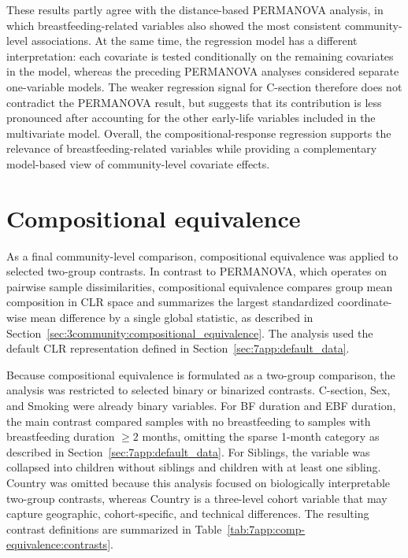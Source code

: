 These results partly agree with the distance-based PERMANOVA analysis, in which breastfeeding-related variables also showed the most consistent community-level associations. At the same time, the regression model has a different interpretation: each covariate is tested conditionally on the remaining covariates in the model, whereas the preceding PERMANOVA analyses considered separate one-variable models. The weaker regression signal for C-section therefore does not contradict the PERMANOVA result, but suggests that its contribution is less pronounced after accounting for the other early-life variables included in the multivariate model. Overall, the compositional-response regression supports the relevance of breastfeeding-related variables while providing a complementary model-based view of community-level covariate effects.

\section{Compositional equivalence}
\label{sec:7app:compositional-equivalence}

As a final community-level comparison, compositional equivalence was applied to selected two-group contrasts. In contrast to PERMANOVA, which operates on pairwise sample dissimilarities, compositional equivalence compares group mean composition in CLR space and summarizes the largest standardized coordinate-wise mean difference by a single global statistic, as described in Section~\ref{sec:3community:compositional_equivalence}. The analysis used the default CLR representation defined in Section~\ref{sec:7app:default_data}.

Because compositional equivalence is formulated as a two-group comparison, the analysis was restricted to selected binary or binarized contrasts. C-section, Sex, and Smoking were already binary variables. For BF duration and EBF duration, the main contrast compared samples with no breastfeeding to samples with breastfeeding duration $\ge 2$ months, omitting the sparse 1-month category as described in Section~\ref{sec:7app:default_data}. For Siblings, the variable was collapsed into children without siblings and children with at least one sibling. Country was omitted because this analysis focused on biologically interpretable two-group contrasts, whereas Country is a three-level cohort variable that may capture geographic, cohort-specific, and technical differences. The resulting contrast definitions are summarized in Table~\ref{tab:7app:comp-equivalence:contrasts}.

